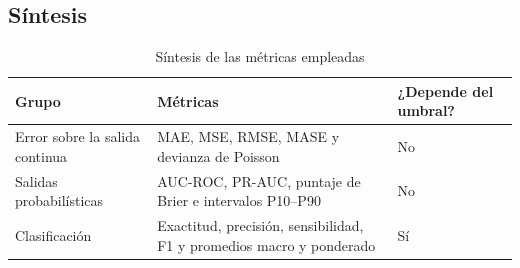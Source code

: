\subsection{Síntesis}

\begin{table}[htbp]
\centering
\caption{Síntesis de las métricas empleadas}
\label{tab:sintesis-metricas}
\begin{tabularx}{\linewidth}{@{}lXl@{}}
\toprule
\textbf{Grupo} & \textbf{Métricas} & \textbf{¿Depende del umbral?} \\
\midrule
Error sobre la salida continua & MAE, MSE, RMSE, MASE y devianza de Poisson & No \\
Salidas probabilísticas & AUC-ROC, PR-AUC, puntaje de Brier e intervalos P10--P90 & No \\
Clasificación & Exactitud, precisión, sensibilidad, F1 y promedios macro y ponderado & Sí \\
\bottomrule
\end{tabularx}
\end{table}
